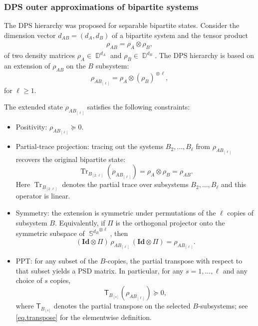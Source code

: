 \documentclass[smallextended]{svjour3}
\DeclareMathOperator{\dmat}{\mathbb{D}}
\newcommand{\1}{\mathbf{1}}
\newcommand{\Id}{\mathbf{Id}}
\DeclareMathOperator{\herm}{\mathbb{S}}
\DeclareMathOperator{\tr}{Tr}
\newcommand{\Tr}{\mathsf{T}}
\DeclareMathOperator{\mtens}{\otimes}
\begin{document}
\subsubsection{DPS outer approximations  of bipartite systems}
\label{sec.rel1}

The DPS hierarchy \cite{doherty2004complete} was proposed for separable bipartite states. Consider the dimension vector $d_{AB}=(d_A,d_B)$ of a bipartite system and the tensor product
\begin{align}\label{sep state}
    \rho_{AB} = \rho_A  \mtens \rho_B,
\end{align}
of two density matrices $\rho_A \in \dmat^{d_A}$ and $\rho_B \in \dmat^{d_B}$. The DPS hierarchy is based on an extension of $\rho_{AB}$ on the $B$ subsystem:
\begin{equation}
\label{eq:stateextension}
    \rho_{AB_{[\ell]}} =  \rho_A  \mtens  (\rho_{B})^{\mtens \ell},
\end{equation}
for $\ell \ge 1$.

The extended state $\rho_{AB_{[\ell]}}$ satisfies the following constraints:
\begin{itemize}
\item[(a)] Positivity: $\rho_{AB_{[\ell]}} \succeq 0$.
\item[(b)] Partial-trace projection: tracing out the systems $B_2,\ldots,B_\ell$ from $\rho_{AB_{[\ell]}}$ recovers the original bipartite state:
\begin{equation}
\label{eq:extensionpartialtracecond}
\tr_{B_{[2:\ell]}} (\rho_{AB_{[\ell]}}) =   \rho_A  \mtens \rho_{B} = \rho_{AB}.
\end{equation}
Here $\tr_{B_{[2:\ell]}}$ denotes the partial trace over subsystems $B_2,\dots,B_\ell$ and this operator is linear.
\item[(c)] Symmetry: the extension is symmetric under permutations of the $\ell$ copies of subsystem $B$. Equivalently, if $\Pi$ is the orthogonal projector onto the symmetric subspace of ${\herm^{d_B}}^{\otimes \ell}$, then
\begin{equation}
\label{eq:extensionsymmetrycond}
(\Id \otimes \Pi)\,\rho_{AB_{[\ell]}}\,(\Id\otimes \Pi) = \rho_{AB_{[\ell]}}.
\end{equation}
\item[(d)] PPT: for any subset of the $B$-copies, the partial transpose with respect to that subset yields a PSD matrix. In particular, for any $s=1,\ldots,\ell$ and any choice of $s$ copies,
\begin{equation}
\label{eq:extensionpptcond}
\Tr_{B_{[s]}}(\rho_{AB_{[\ell]}}) \succeq 0,
\end{equation}
where $\Tr_{B_{[s]}}$ denotes the partial transpose on the selected $B$-subsystems; see \eqref{eq.transpose} for the elementwise definition.
\end{itemize}
\end{document}
